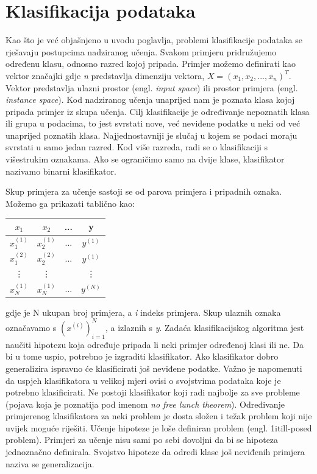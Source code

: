 \documentclass[times, utf8, zavrsni]{fer}
\begin{document}
\section{Klasifikacija podataka}

Kao što je već objašnjeno u uvodu poglavlja, problemi klasifikacije podataka se rješavaju postupcima nadziranog učenja. Svakom primjeru pridružujemo određenu klasu, odnosno razred kojoj pripada. Primjer možemo definirati kao vektor značajki gdje \textit{n} predstavlja dimenziju vektora, $X = (x_1, x_2,..., x_n)^T$. Vektor predstavlja ulazni prostor (engl. \textit{input space}) ili prostor primjera (engl. \textit{instance space}). Kod nadziranog učenja unaprijed nam je poznata klasa kojoj pripada primjer iz skupa učenja. Cilj klasifikacije je određivanje nepoznatih klasa ili grupa u podacima, to jest svrstati nove, već neviđene podatke u neki od već unaprijed poznatih klasa. Najjednostavniji je slučaj u kojem se podaci moraju svrstati u samo jedan razred. Kod više razreda, radi se o klasifikaciji s višestrukim oznakama. Ako se ograničimo samo na dvije klase, klasifikator nazivamo binarni klasifikator. 

Skup primjera za učenje sastoji se od parova primjera i pripadnih oznaka. Možemo ga prikazati tablično kao:

\begin{center}
 \begin{tabular}{||c c c c||} 
 \hline
 $x_1$ & $x_2$ & ... & y  \\ [0.5ex] 
 \hline\hline
 $x_1^{(1)}$ & $x_2^{(1)}$ & ... & $y^{(1)}$ \\ 
 \hline
 $x_1^{(2)}$ & $x_2^{(2)}$ & ... & $y^{(1)}$ \\
 \hline
 \vdots & \vdots &  & \vdots \\
 \hline
 $x_N^{(1)}$ & $x_N^{(1)}$ & ... & $y^{(N)}$ \\ [1ex] 
 \hline
\end{tabular}
\end{center} 


gdje je N ukupan broj primjera, a \textit{i} indeks primjera. Skup ulaznih oznaka označavamo s $(x^{(i)})_{i=1}^N$, a izlaznih s \textit{y}. Zadaća klasifikacijskog algoritma jest naučiti hipotezu koja određuje pripada li neki primjer određenoj klasi ili ne. Da bi u tome uspio, potrebno je izgraditi klasifikator. Ako klasifikator dobro generalizira ispravno će klasificirati još neviđene podatke. Važno je napomenuti da uspjeh klasifikatora u velikoj mjeri ovisi o svojstvima podataka koje je potrebno klasificirati. Ne postoji klasifikator koji radi najbolje za sve probleme (pojava koja je poznatija pod imenom \textit{no free lunch theorem}). Određivanje primjerenog klasifikatora za neki problem je dosta složen i težak problem koji nije uvijek moguće riješiti. Učenje hipoteze je loše definiran problem (engl. \text1it{ill-posed problem}). Primjeri za učenje nisu sami po sebi dovoljni da bi se hipoteza jednoznačno definirala. Svojstvo hipoteze da odredi klase još neviđenih primjera naziva se generalizacija. 
\end{document}
